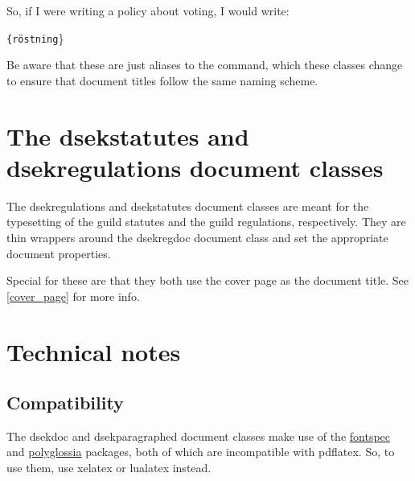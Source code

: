\documentclass[a4paper, oneside]{ltxdoc}
\begin{document}
So, if I were writing a policy about voting, I would write:

\begin{center}
  \texttt{\{röstning}\}
\end{center}

Be aware that these are just aliases to the  command, which these
classes change to ensure that document titles follow the same naming scheme.

\section{The \textsf{dsekstatutes} and \textsf{dsekregulations} document classes}
The \textsf{dsekregulations} and \textsf{dsekstatutes} document classes are
meant for the typesetting of the guild statutes and the guild regulations,
respectively.  They are thin wrappers around the \textsf{dsekregdoc} document
class and set the appropriate document properties.

Special for these are that they both use the cover page as the document title.
See \ref{cover_page} for more info.

\section{Technical notes}

\subsection{Compatibility}

The \textsf{dsekdoc} and \textsf{dsekparagraphed} document classes make use of
the \href{https://ctan.org/pkg/fontspec}{\textsf{fontspec}} and
\href{https://ctan.org/pkg/polyglossia}{\textsf{polyglossia}} packages, both of
which are incompatible with \textsf{pdflatex}.  So, to use them, use
\textsf{xelatex} or \textsf{lualatex} instead.
\end{document}
